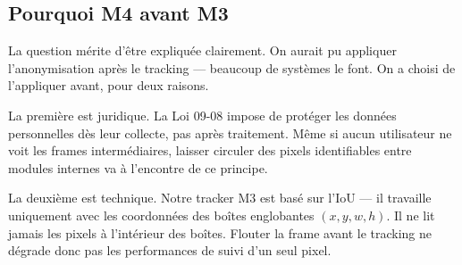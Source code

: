 \subsection{Pourquoi M4 avant M3}

La question mérite d'être expliquée
clairement. On aurait pu appliquer
l'anonymisation après le tracking —
beaucoup de systèmes le font. On a
choisi de l'appliquer avant, pour
deux raisons.

La première est juridique. La Loi 09-08
impose de protéger les données personnelles
dès leur collecte, pas après traitement.
Même si aucun utilisateur ne voit les
frames intermédiaires, laisser circuler
des pixels identifiables entre modules
internes va à l'encontre de ce principe.

La deuxième est technique. Notre tracker
M3 est basé sur l'IoU — il travaille
uniquement avec les coordonnées des
boîtes englobantes $(x, y, w, h)$. Il
ne lit jamais les pixels à l'intérieur
des boîtes. Flouter la frame avant le
tracking ne dégrade donc pas les
performances de suivi d'un seul pixel.

